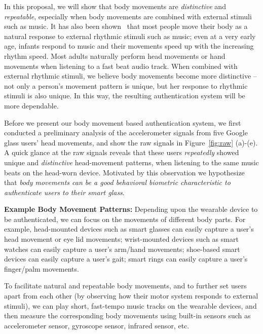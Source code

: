 In this proposal, we will show that body movements are \emph{distinctive} and \emph{repeatable}, especially when body movements are combined with external stimuli such as music. It has also been shown~\cite{zentner2010rhythmic} that most people move
their body as a natural response to external rhythmic stimuli such as music;
even at a very early age, infants respond to music and their movements speed
up with the increasing rhythm speed. Most adults naturally
perform head movements or hand movements when listening to a fast beat audio track.  When combined with external rhythmic stimuli, we believe body movements become more distinctive -- not only a person's movement pattern is unique, but her response to rhythmic stimuli is also unique. In this way, the resulting authentication system will be more dependable.

Before we present our body movement based authentication system, we first conducted a preliminary analysis of the accelerometer signals from five Google glass
users' head movements, and show the raw signals in Figure~\ref{fig:raw} (a)-(e). A quick glance at the raw signals reveals that these users
{\em repeatedly} showed unique and {\em distinctive} head-movement patterns, when listening to the same music beats on the head-worn device. Motivated by this observation we hypothesize that \emph{body movements can be a good behavioral biometric characteristic to authenticate
users to their smart glass}.

\vspace{4pt}\textbf{Example Body Movement Patterns:} Depending upon the wearable device to be authenticated, we can focus on the movements of different body parts. For example, head-mounted devices such as smart glasses can easily capture a user's head movement or eye lid movements; wrist-mounted devices such as smart watches can easily capture a user's arm/hand movements; shoe-based smart devices can easily capture a user's gait; smart rings can easily capture a user's finger/palm movements.

To facilitate natural and repeatable body movements, and to further set users apart from each other (by observing how their motor system responds to external stimuli), we can play short, fast-tempo music tracks on the wearable devices, and then measure the corresponding body movements using built-in sensors such as accelerometer sensor, gyroscope sensor, infrared sensor, etc.

